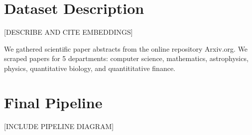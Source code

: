\section{Dataset Description}
[DESCRIBE AND CITE EMBEDDINGS]

We gathered scientific paper abstracts from the online repository Arxiv.org.
We scraped papers for 5 departments: computer science, mathematics, astrophysics, physics, quantitative biology, and quantititative finance.

\section{Final Pipeline}
[INCLUDE PIPELINE DIAGRAM]
